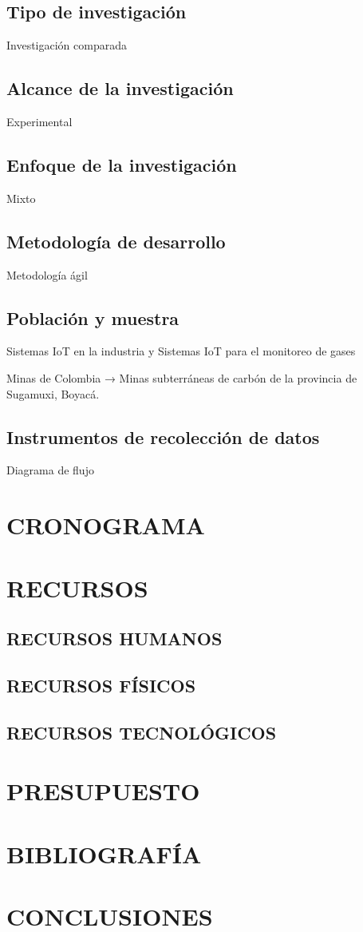 \documentclass[stu,12pt,floatsintext]{apa7}
\begin{document}
	\subsection{Tipo de investigación}
	Investigación comparada
	\subsection{Alcance de la investigación}
	Experimental
	\subsection{Enfoque de la investigación}
	Mixto
	\subsection{Metodología de desarrollo}
	Metodología ágil
	\subsection{Población y muestra}
	Sistemas IoT en la industria y Sistemas IoT para el monitoreo de gases
	
	Minas de Colombia → Minas subterráneas de carbón de la provincia de Sugamuxi, Boyacá.
	\subsection{Instrumentos de recolección de datos}
	Diagrama de flujo
	\section{CRONOGRAMA}
	
	\section{RECURSOS}
	\subsection{RECURSOS HUMANOS}
	\subsection{RECURSOS FÍSICOS}
	\subsection{RECURSOS TECNOLÓGICOS}
	
	\section{PRESUPUESTO}
	
	\section{BIBLIOGRAFÍA}
	\renewcommand\refname{Referencias}
	
	
	
	

	
	
	\section{CONCLUSIONES}
	
\end{document}
